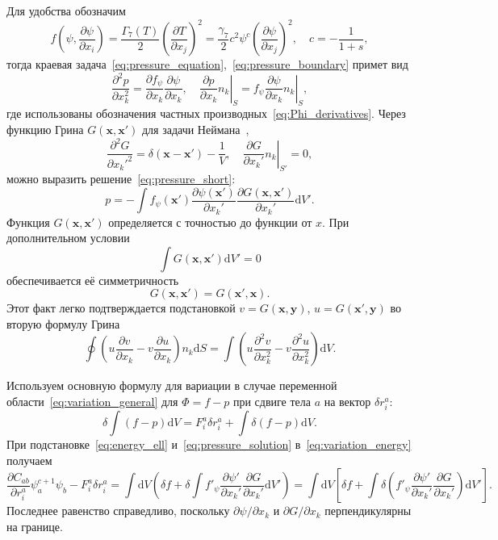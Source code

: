 \documentclass{article}
\theoremstyle{plain}
\newcommand{\dd}{\mathrm{d}}
\newcommand{\pder}[2][]{\frac{\partial#1}{\partial#2}}
\newcommand{\pderdual}[2][]{\frac{\partial^2#1}{\partial#2^2}}
\newcommand{\Pder}[2][]{\partial#1/\partial#2}
\newcommand{\bx}{\boldsymbol{x}}
\newcommand{\by}{\boldsymbol{y}}
\begin{document}
Для удобства обозначим
\begin{equation}\label{eq:g7_function}
    f\left(\psi,\pder[\psi]{x_i}\right) = \frac{\Gamma_7(T)}2\left(\pder[T]{x_j}\right)^2 =
    \frac{\gamma_7}2 c^2 \psi^c\left(\pder[\psi]{x_j}\right)^2, \quad c=-\frac1{1+s},
\end{equation}
тогда краевая задача~\eqref{eq:pressure_equation},~\eqref{eq:pressure_boundary} примет вид
\begin{equation}\label{eq:pressure_short}
    \pderdual[p]{x_k} = \pder[f_\psi]{x_k}\pder[\psi]{x_k}, \quad
    \left.\pder[p]{x_k}n_k\right|_S = \left.f_\psi\pder[\psi]{x_k}n_k\right|_S,
\end{equation}
где использованы обозначения частных производных~\eqref{eq:Phi_derivatives}.
Через функцию Грина \(G(\bx, \bx')\) для задачи Неймана~\cite{Franklin2012},
\begin{equation}\label{eq:Green_function}
    \pderdual[G]{x_k'} = \delta(\bx-\bx') - \frac1V, \quad
    \left.\pder[G]{x_k'}n_k\right|_{S'} = 0,
\end{equation}
можно выразить решение~\eqref{eq:pressure_short}:
\begin{equation}\label{eq:pressure_solution}
    p = -\int f_\psi(\bx')\pder[\psi(\bx')]{x_k'}\pder[G(\bx,\bx')]{x_k'} \dd{V'}.
\end{equation}
Функция \(G(\bx, \bx')\) определяется с точностью до функции от \(x\).
При дополнительном условии
\begin{equation}\label{eq:Green_normalization}
    \int G(\bx, \bx') \dd{V'} = 0
\end{equation}
обеспечивается её симметричность
\begin{equation}\label{eq:Green_symmetry}
    G(\bx, \bx') = G(\bx', \bx).
\end{equation}
Этот факт легко подтверждается подстановкой \(v=G(\bx,\by)\), \(u=G(\bx',\by)\)
во вторую формулу Грина
\begin{equation}\label{eq:Green_second_identity}
    \oint \left( u\pder[v]{x_k} - v\pder[u]{x_k} \right)n_k\dd{S} =
    \int \left( u\pderdual[v]{x_k} - v\pderdual[u]{x_k} \right)\dd{V}.
\end{equation}

Используем основную формулу для вариации в случае переменной области~\eqref{eq:variation_general}
для \(\Phi = f-p\) при сдвиге тела \(a\) на вектор \(\delta r^a_i\):
\begin{equation}\label{eq:variation_energy}
    \delta\int(f-p)\dd{V} = F^a_i \delta r^a_i + \int\delta(f-p)\dd{V}.
\end{equation}
При подстановке~\eqref{eq:energy_ell} и~\eqref{eq:pressure_solution} в~\eqref{eq:variation_energy} получаем
\begin{equation}\label{eq:variation_energy2}
    \pder[C_{ab}]{r^a_i} \psi^{c+1}_a \psi_b - F^a_i \delta r^a_i =
    \int\dd{V}\left( \delta{f} + \delta\int f'_\psi\pder[\psi']{x_k'}\pder[G]{x_k'} \dd{V'} \right) =
    \int\dd{V}\left[ \delta{f} + \int\delta\left( f'_\psi\pder[\psi']{x_k'}\pder[G]{x_k'}\right) \dd{V'} \right].
\end{equation}
Последнее равенство справедливо, поскольку \(\Pder[\psi]{x_k}\) и \(\Pder[G]{x_k}\) перпендикулярны на границе.
\end{document}
